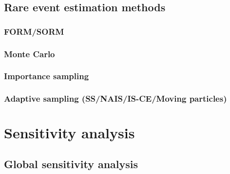 \subsection{Rare event estimation methods}

\subsubsection{FORM/SORM}

\subsubsection{Monte Carlo}

\subsubsection{Importance sampling}

\subsubsection{Adaptive sampling (SS/NAIS/IS-CE/Moving particles)}





\section{Sensitivity analysis}

\subsection{Global sensitivity analysis}

